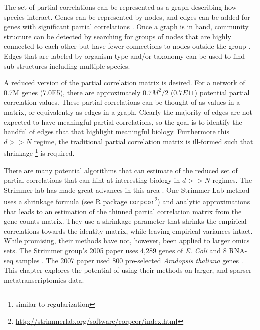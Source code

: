 The set of partial correlations can be represented as a graph describing how species interact.
Genes can be represented by nodes, and edges can be added for genes with significant partial correlations \cite{borthagaray2014}.
Once a graph is in hand, community structure can be detected by searching for groups of nodes that are highly connected to each other but have fewer connections to nodes outside the group \cite{hero2012}.
Edges that are labeled by organism type and/or taxonomy can be used to find sub-structures including multiple species.

A reduced version of the partial correlation matrix is desired.
For a network of 0.7M genes (7.0E5), there are approximately 0$.7M^2/2$ ($0.7E11$) potential partial correlation values. %
These partial correlations can be thought of as values in a matrix, or equivalently as edges in a graph.
Clearly the majority of edges are not expected to have meaningful partial correlations, so the goal is to identify the handful of edges that that highlight meaningful biology.
Furthermore this $d >> N$ regime, the traditional partial correlation matrix is ill-formed \cite{whittaker2009} such that shrinkage \footnote{similar to regularization} is required.

There are many potential algorithms that can estimate of the reduced set of partial correlations that can hint at interesting biology in $d >> N$ regimes.
The Strimmer lab has made great advances in this area \cite{schafer2001, schafer2005, opgen2007shrinkage}.
One Strimmer Lab method uses a shrinkage formula (see R package \texttt{corpcor}\footnote{\url{http://strimmerlab.org/software/corpcor/index.html}}) and analytic approximations that leads to an estimation of the thinned partial correlation matrix from the gene counts matrix.
They use a shrinkage parameter that shrinks the empirical correlations towards the identity matrix, while leaving empirical variances intact.
While promising, their methods have not, however, been applied to larger omics sets.
The Strimmer group's 2005 paper uses 4,289 genes of \textit{E. Coli} and 8 RNA-seq samples \cite{schafer2005}.
The 2007 paper used 800 pre-selected \textit{Aradopsis thaliana} genes \cite{opgen2007Aradopsis}.
This chapter explores the potential of using their methods on larger, and sparser metatranscriptomics data.


